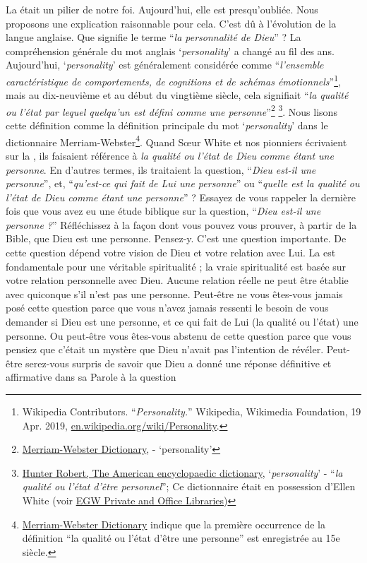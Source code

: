 La  était un pilier de notre foi. Aujourd'hui, elle est presqu'oubliée. Nous proposons une explication raisonnable pour cela. C'est dû à l'évolution de la langue anglaise. Que signifie le terme “\textit{la personnalité de Dieu}” ? La compréhension générale du mot anglais ‘\textit{personality}’ a changé au fil des ans. Aujourd'hui, ‘\textit{personality}’ est généralement considérée comme “\textit{l'ensemble caractéristique de comportements, de cognitions et de schémas émotionnels}”\footnote{Wikipedia Contributors. “\textit{Personality.}” Wikipedia, Wikimedia Foundation, 19 Apr. 2019, \href{https://en.wikipedia.org/wiki/Personality}{en.wikipedia.org/wiki/Personality}.}, mais au dix-neuvième et au début du vingtième siècle, cela signifiait “\textit{la qualité ou l'état par lequel quelqu'un est défini comme une personne}”\footnote{\href{https://www.merriam-webster.com/dictionary/personality}{Merriam-Webster Dictionary}, - ‘personality’} \footnote{\href{https://babel.hathitrust.org/cgi/pt?id=mdp.39015050663213&view=1up&seq=780}{Hunter Robert, The American encyclopaedic dictionary}, ‘\textit{personality}’ - “\textit{la qualité ou l'état d'être personnel}”; Ce dictionnaire était en possession d'Ellen White (voir \href{https://repo.adventistdigitallibrary.org/PDFs/adl-22/adl-22251050.pdf?_ga=2.116010630.1065317374.1621993520-1506151612.1617862694&fbclid=IwAR3vwmp8jxtnpPEKv0KD9mCv8dJpmRGoyIXW0CkbQAjbU0h6YaBGqhgBzbk}{EGW Private and Office Libraries})}. Nous lisons cette définition comme la définition principale du mot ‘\textit{personality}’ dans le dictionnaire Merriam-Webster\footnote{\href{https://www.merriam-webster.com/dictionary/personality\#word-history}{Merriam-Webster Dictionary} indique que la première occurrence de la définition “la qualité ou l'état d'être une personne” est enregistrée au 15e siècle.}. Quand Sœur White et nos pionniers écrivaient sur la , ils faisaient référence à \textit{la qualité ou l'état de Dieu comme étant une personne}. En d'autres termes, ils traitaient la question, “\textit{Dieu est-il une personne}”, et, “\textit{qu'est-ce qui fait de Lui une personne}” ou “\textit{quelle est la qualité ou l'état de Dieu comme étant une personne}” ? Essayez de vous rappeler la dernière fois que vous avez eu une étude biblique sur la question, “\textit{Dieu est-il une personne ?}” Réfléchissez à la façon dont vous pouvez vous prouver, à partir de la Bible, que Dieu est une personne. Pensez-y. C'est une question importante. De cette question dépend votre vision de Dieu et votre relation avec Lui. La  est fondamentale pour une véritable spiritualité ; la vraie spiritualité est basée sur votre relation personnelle avec Dieu. Aucune relation réelle ne peut être établie avec quiconque s'il n'est pas une personne. Peut-être ne vous êtes-vous jamais posé cette question parce que vous n'avez jamais ressenti le besoin de vous demander si Dieu est une personne, et ce qui fait de Lui (la qualité ou l'état) une personne. Ou peut-être vous êtes-vous abstenu de cette question parce que vous pensiez que c'était un mystère que Dieu n'avait pas l'intention de révéler. Peut-être serez-vous surpris de savoir que Dieu a donné une réponse définitive et affirmative dans sa Parole à la question 